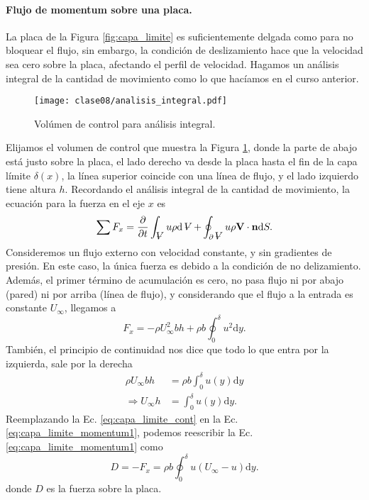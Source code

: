 \paragraph*{Flujo de momentum sobre una placa.}
La placa de la Figura \ref{fig:capa_limite} es suficientemente delgada como para no bloquear el flujo, sin embargo, la condición de deslizamiento hace que la velocidad sea cero sobre la placa, afectando el perfil de velocidad.
Hagamos un análisis integral de la cantidad de movimiento como lo que hacíamos en el curso anterior.
%
\begin{figure}[!h]
\centering
\texttt{[image: clase08/analisis\_integral.pdf]}
\caption{Volúmen de control para análisis integral.}
\label{fig:analisis_integral}
\end{figure}
%
Elijamos el volumen de control que muestra la Figura \ref{fig:analisis_integral}, donde la parte de abajo está justo sobre la placa, el lado derecho va desde la placa hasta el fin de la capa límite $\delta(x)$, la línea superior coincide con una línea de flujo, y el lado izquierdo tiene altura $h$.
Recordando el análisis integral de la cantidad de movimiento, la ecuación para la fuerza en el eje $x$ es
%
\begin{equation}
\sum F_x = \frac{\partial}{\partial t} \int_{\vol} u\rho \mathrm{d}\vol + \oint_{\partial\vol} u\rho\mathbf{V}\cdot\mathbf{n}\mathrm{d}S.
\end{equation}
%
Consideremos un flujo externo con velocidad constante, y sin gradientes de presión. En este caso, la única fuerza es debido a la condición de no delizamiento. Además, el primer término de acumulación es cero, no pasa flujo ni por abajo (pared) ni por arriba (línea de flujo), y considerando que el flujo a la entrada es constante $U_\infty$, llegamos a
%
\begin{equation}\label{eq:capa_limite_momentum1}
F_x = -\rho U_\infty^2 bh + \rho b \oint_0^\delta u^2\mathrm{d}y.
\end{equation}
%
También, el principio de continuidad nos dice que todo lo que entra por la izquierda, sale por la derecha
%
\begin{align}\label{eq:capa_limite_cont}
\rho U_\infty bh &= \rho b \int_0^\delta u(y)\mathrm{d}y \nonumber\\
\Rightarrow U_\infty h &= \int_0^\delta u(y)\mathrm{d}y.
\end{align}
%
Reemplazando la Ec. \eqref{eq:capa_limite_cont} en la Ec. \eqref{eq:capa_limite_momentum1}, podemos reescribir la Ec. \eqref{eq:capa_limite_momentum1} como
%
\begin{equation}\label{eq:capa_limite_momentum}
D = -F_x = \rho b \oint_0^\delta u(U_\infty - u)\mathrm{d}y.
\end{equation}
%
donde $D$ es la fuerza sobre la placa.

